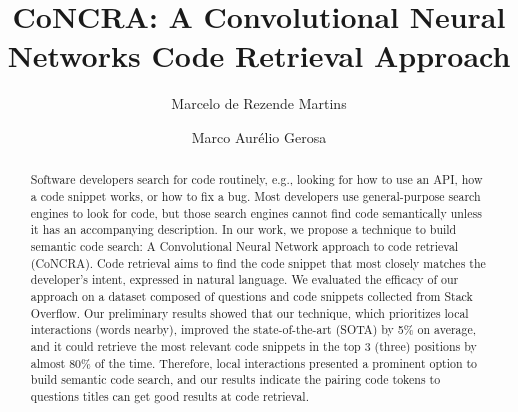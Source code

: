 \documentclass[sigconf]{acmart}
\begin{document}
\title{CoNCRA: A Convolutional Neural Networks Code Retrieval Approach}

\author{Marcelo de Rezende Martins}


\author{Marco Aurélio Gerosa}



\begin{abstract}
    Software developers search for code routinely, e.g., looking for how to use an API, how a code snippet works, or how to fix a bug. Most developers use general-purpose search engines to look for code, but those search engines cannot find code semantically unless it has an accompanying description. In our work, we propose a technique to build semantic code search: A Convolutional Neural Network approach to code retrieval (CoNCRA). Code retrieval aims to find the code snippet that most closely matches the developer's intent, expressed in natural language. We evaluated the efficacy of our approach on a dataset composed of questions and code snippets collected from Stack Overflow. Our preliminary results showed that our technique, which prioritizes local interactions (words nearby), improved the state-of-the-art (SOTA) by 5\% on average, and it could retrieve the most relevant code snippets in the top 3 (three) positions by almost 80\% of the time. Therefore, local interactions presented a prominent option to build semantic code search, and our results indicate the pairing code tokens to questions titles can get good results at code retrieval.
\end{abstract}
\end{document}
